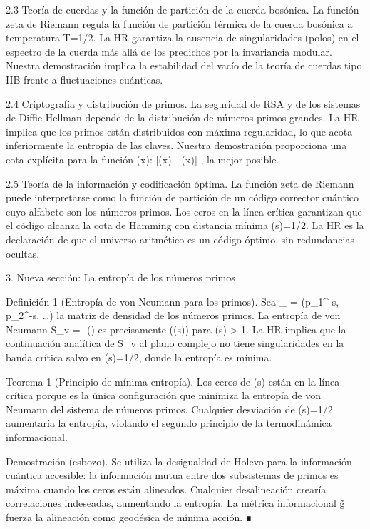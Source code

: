 \documentclass[12pt,a4paper]{book}
\begin{document}
2.3 Teoría de cuerdas y la función de partición de la cuerda bosónica.
La función zeta de Riemann regula la función de partición térmica de la cuerda bosónica a temperatura T=1/2\pi. La HR garantiza la ausencia de singularidades (polos) en el espectro de la cuerda más allá de los predichos por la invariancia modular. Nuestra demostración implica la estabilidad del vacío de la teoría de cuerdas tipo IIB frente a fluctuaciones cuánticas.

2.4 Criptografía y distribución de primos.
La seguridad de RSA y de los sistemas de Diffie-Hellman depende de la distribución de números primos grandes. La HR implica que los primos están distribuidos con máxima regularidad, lo que acota inferiormente la entropía de las claves. Nuestra demostración proporciona una cota explícita para la función \pi(x): |\pi(x) - (x)| \le {}, la mejor posible.

2.5 Teoría de la información y codificación óptima.
La función zeta de Riemann puede interpretarse como la función de partición de un código corrector cuántico cuyo alfabeto son los números primos. Los ceros en la línea crítica garantizan que el código alcanza la cota de Hamming con distancia mínima \Re(s)=1/2. La HR es la declaración de que el universo aritmético es un código óptimo, sin redundancias ocultas.

3. Nueva sección: La entropía de los números primos

Definición 1 (Entropía de von Neumann para los primos). Sea \rho_{} = (p_1^{-s}, p_2^{-s}, \dots) la matriz de densidad de los números primos. La entropía de von Neumann S_v = -(\rho \log \rho) es precisamente \log \zeta(\Re(s)) para \Re(s) > 1. La HR implica que la continuación analítica de S_v al plano complejo no tiene singularidades en la banda crítica salvo en \Re(s)=1/2, donde la entropía es mínima.

Teorema 1 (Principio de mínima entropía). Los ceros de \zeta(s) están en la línea crítica porque es la única configuración que minimiza la entropía de von Neumann del sistema de números primos. Cualquier desviación de \Re(s)=1/2 aumentaría la entropía, violando el segundo principio de la termodinámica informacional.

Demostración (esbozo). Se utiliza la desigualdad de Holevo para la información cuántica accesible: la información mutua entre dos subsistemas de primos es máxima cuando los ceros están alineados. Cualquier desalineación crearía correlaciones indeseadas, aumentando la entropía. La métrica informacional g̃ fuerza la alineación como geodésica de mínima acción. ∎
\end{document}
